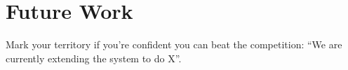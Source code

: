 \section{Future Work}
\label{sec:future}
Mark your territory if you're confident you can beat the competition: ``We are
currently extending the system to do X''.